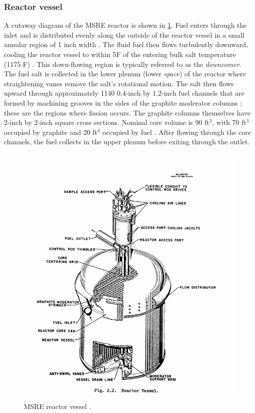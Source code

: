 \documentclass{article}
\let\Oldsubsubsection\subsubsection
\renewcommand{\subsubsection}{\FloatBarrier\Oldsubsubsection}
\begin{document}
\subsubsection{Reactor vessel}

A cutaway diagram of the \gls{MSRE} reactor is shown in \cref{fig:MSRE_reactor}. Fuel
enters through the inlet and is distributed evenly along the outside of the
reactor vessel in a small annular region of 1 inch
width \cite{robertson_msre_1965}. The fluid fuel then flows turbulently 
downward, cooling the reactor vessel to within 5\textdegree F of the entering 
bulk salt temperature (1175 \textdegree F) \cite{robertson_msre_1965}. This 
down-flowing region is typically referred to as the \textit{downcomer}. The 
fuel salt is collected in the lower plenum (lower \textit{space}) of the 
reactor where straightening vanes remove the salt's rotational motion. The salt 
then flows upward through approximately 1140 0.4-inch by 1.2-inch fuel channels 
that are formed by machining grooves in the sides of the graphite moderator 
columns \cite{robertson_msre_1965}; these are the regions where fission occurs. 
The graphite columns themselves have 2-inch by 2-inch square cross sections. 
Nominal core volume is 90 ft$^3$, with 70 ft$^3$ occupied by graphite and 20 
ft$^3$ occupied by fuel \cite{robertson_msre_1965}.
After flowing through the core channels, the fuel collects in the upper plenum
before exiting through the outlet.

\begin{figure}[htpb]
  \centering
  \includegraphics[max height=.5\textheight,max width=\textwidth,keepaspectratio]{MSRE_reactor_vessel.png}
  \caption{\gls{MSRE} reactor vessel \cite{robertson_msre_1965}.}
  \label{fig:MSRE_reactor}
\end{figure}
\end{document}
